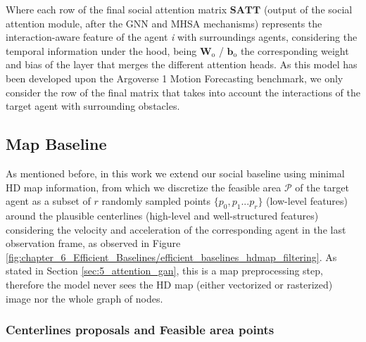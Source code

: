 Where each row of the final social attention matrix $\mathbf{SATT}$ (output of the social attention module, after the GNN and MHSA mechanisms) represents the interaction-aware feature of the agent \textit{i} with surroundings agents, considering the temporal information under the hood, being $\mathbf{W}_\mathrm{o}$ / $\mathbf{b}_\mathrm{o}$ the corresponding weight and bias of the layer that merges the different attention heads. As this model has been developed upon the Argoverse 1 Motion Forecasting benchmark, we only consider the row of the final matrix that takes into account the interactions of the target agent with surrounding obstacles.

\subsection{Map Baseline} 
\label{subsec:6_efficient_baselines_map_baseline}

As mentioned before, in this work we extend our social baseline using minimal HD map information, from which we discretize the feasible area $\mathcal{P}$ of the target agent as a subset of $r$ randomly sampled points $\{p_0 , p_1 ... p_r\}$ (low-level features) around the plausible centerlines (high-level and well-structured features) considering the velocity and acceleration of the corresponding agent in the last observation frame, as observed in Figure \ref{fig:chapter_6_Efficient_Baselines/efficient_baselines_hdmap_filtering}. As stated in Section \ref{sec:5_attention_gan}, this is a map preprocessing step, therefore the model never sees the HD map (either vectorized or rasterized) image nor the whole graph of nodes.

\subsubsection{Centerlines proposals and Feasible area points} 
\label{subsubsec:6_efficient_baselines_preprocessing_map}

